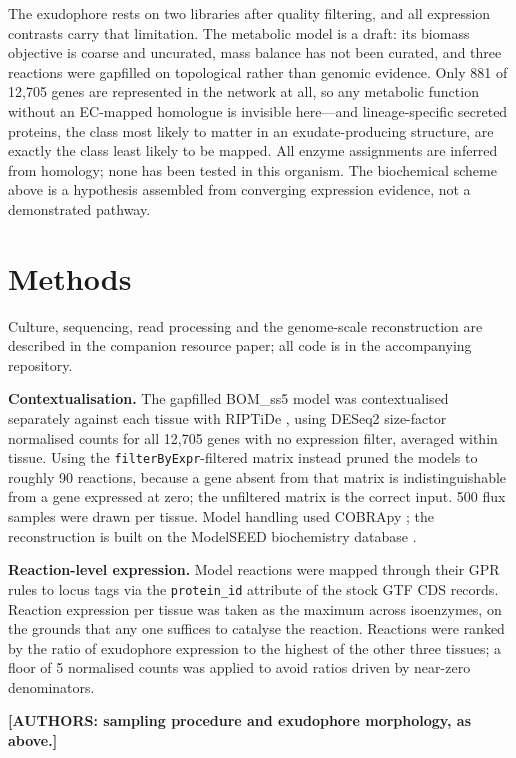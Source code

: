 The exudophore rests on two libraries after quality filtering, and all expression contrasts
carry that limitation. The metabolic model is a draft: its biomass objective is coarse and
uncurated, mass balance has not been curated, and three reactions were gapfilled on topological
rather than genomic evidence. Only 881 of 12,705 genes are represented in the network at all,
so any metabolic function without an EC-mapped homologue is invisible here---and lineage-specific
secreted proteins, the class most likely to matter in an exudate-producing structure, are
exactly the class least likely to be mapped. All enzyme assignments are inferred from homology;
none has been tested in this organism. The biochemical scheme above is a hypothesis assembled
from converging expression evidence, not a demonstrated pathway.

\section{Methods}

Culture, sequencing, read processing and the genome-scale reconstruction are described in the
companion resource paper; all code is in the accompanying repository.

\textbf{Contextualisation.} The gapfilled BOM\_ss5 model was contextualised separately against
each tissue with RIPTiDe \cite{jenior2020riptide}, using DESeq2 \cite{love2014deseq2} size-factor normalised counts for all 12,705 genes with
no expression filter, averaged within tissue. Using the \texttt{filterByExpr}-filtered matrix
instead pruned the models to roughly 90 reactions, because a gene absent from that matrix is
indistinguishable from a gene expressed at zero; the unfiltered matrix is the correct input.
500 flux samples were drawn per tissue. Model handling used COBRApy \cite{ebrahim2013cobrapy}; the reconstruction is built on the ModelSEED biochemistry database \cite{seaver2021modelseed}.

\textbf{Reaction-level expression.} Model reactions were mapped through their GPR rules to
locus tags via the \texttt{protein\_id} attribute of the stock GTF CDS records. Reaction
expression per tissue was taken as the maximum across isoenzymes, on the grounds that any one
suffices to catalyse the reaction. Reactions were ranked by the ratio of exudophore expression
to the highest of the other three tissues; a floor of 5 normalised counts was applied to avoid
ratios driven by near-zero denominators.

\noindent\textbf{[AUTHORS: sampling procedure and exudophore morphology, as above.]}

